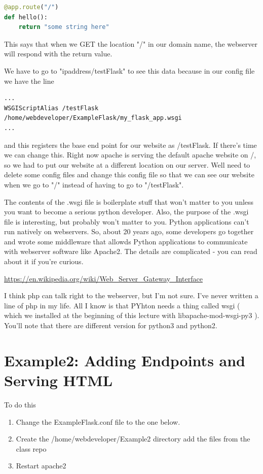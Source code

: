 \documentclass[10pt]{article}
\begin{document}
\begin{lstlisting}[language=Python]
@app.route("/")
def hello():
	return "some string here"
\end{lstlisting}
 
This says that when we GET the location "/" in our domain name, the webserver will respond with the return value.

We have to go to "ipaddress/testFlask" to see this data because in our config file we have the line

\begin{lstlisting}
...
WSGIScriptAlias /testFlask /home/webdeveloper/ExampleFlask/my_flask_app.wsgi
...
\end{lstlisting}

and this registers the base end point for our website as /testFlask. If there's time we can change this. Right now apache is serving the default apache website on /, so we had to put our website at a different location on our server. Well need to delete some config files and change this config file so that we can see our website when we go to "/" instead of having to go to "/testFlask".

The contents of the .wsgi file is boilerplate stuff that won't matter to you unless you want to become a serious python developer. Also, the purpose of the .wsgi file is interesting, but probably won't matter to you. Python applications can't run natively on webservers. So, about 20 years ago, some developers go together and wrote some middleware that allowds Python applications to communicate with webserver software like Apache2. The details are complicated - you can read about it if you're curious. 

\url{https://en.wikipedia.org/wiki/Web_Server_Gateway_Interface}

I think php can talk right to the webserver, but I'm not sure. I've never written a line of php in my life. All I know is that PYhton needs a thing called wsgi ( which we installed at the beginning of this lecture with libapache-mod-wsgi-py3 ). You'll note that there are different version for python3 and python2.

\section{Example2: Adding Endpoints and Serving HTML}
To do this
\begin{enumerate}
\item Change the ExampleFlask.conf file to the one below.
\item Create the /home/webdeveloper/Example2 directory add the files from the class repo
\item Restart apache2
\end{enumerate}
\end{document}
